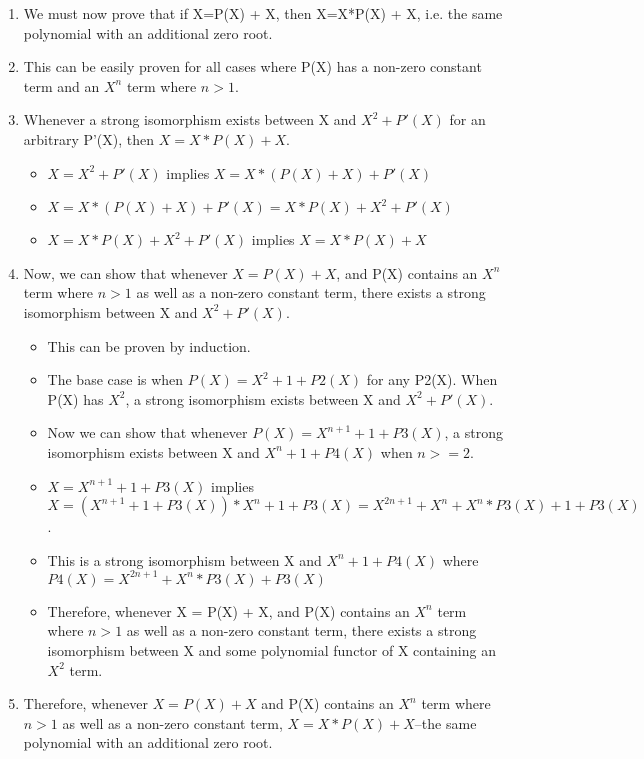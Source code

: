 \documentclass[letterpaper,numbers=enddot]{scrartcl}
\begin{document}
\begin{enumerate}
  \item We must now prove that if X=P(X) + X, then X=X*P(X) + X, i.e. the
  same polynomial with an additional zero root.

  \item This can be easily proven for all cases where P(X) has a non-zero constant term and an $X^n$ term where $n > 1$.

  \item Whenever a strong isomorphism exists between X and $X^2 + P'(X)$ for an arbitrary P'(X), then $X = X*P(X) + X$.

  \begin{itemize}
    \item $X = X^2 + P'(X)$ implies $X = X*(P(X) + X) + P'(X)$

    \item $X = X*(P(X) + X) + P'(X) = X*P(X) + X^2 + P'(X)$

    \item $X = X*P(X) + X^2 + P'(X)$ implies $X = X*P(X) + X$

  \end{itemize}

  \item Now, we can show that whenever $X = P(X) + X$, and P(X) contains an $X^n$ term where $n > 1$ as well as a non-zero constant term, there exists a strong isomorphism between X and $X^2 + P'(X)$.

  \begin{itemize}
    \item This can be proven by induction.

    \item The base case is when $P(X) = X^2 + 1 + P2(X)$ for any P2(X).
    When P(X) has $X^2$, a strong isomorphism exists between X and $X^2 + P'(X)$.

    \item Now we can show that whenever $P(X) = X^{n+1} + 1 + P3(X)$, a strong isomorphism exists between X and $X^n + 1 + P4(X)$ when $n >= 2$.

    \item $X = X^{n+1} + 1 + P3(X)$ implies $X = (X^{n+1} + 1 + P3(X))*X^n + 1 + P3(X) = X^{2n+1} + X^n + X^n*P3(X) + 1 + P3(X)$.

    \item This is a strong isomorphism between X and $X^n + 1 + P4(X)$ where $P4(X) = X^{2n+1} + X^n*P3(X) + P3(X)$

    \item Therefore, whenever X = P(X) + X, and P(X) contains an $X^n$ term
    where $n > 1$ as well as a non-zero constant term, there exists a strong isomorphism between X and some polynomial functor of X containing an $X^2$ term.
  \end{itemize}

  \item Therefore, whenever $X = P(X) + X$ and P(X) contains an $X^n$ term where $n > 1$ as well as a non-zero constant term, $X = X*P(X) + X$--the same polynomial with an additional zero root.

\end{enumerate}
\end{document}
